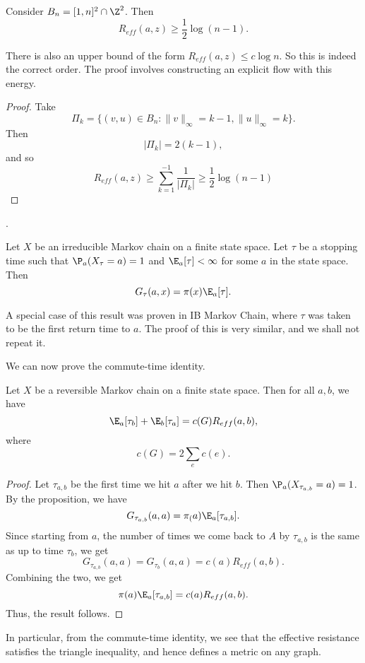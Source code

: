 \documentclass[a4paper]{article}
\begin{document}
\begin{cor}
  Consider $B_n = [1, n]^2 \cap \Z^2$. Then
  \[
    R_{eff}(a, z) \geq \frac{1}{2} \log (n - 1).
  \]
\end{cor}
There is also an upper bound of the form $R_{eff}(a, z) \leq c \log n$. So this is indeed the correct order. The proof involves constructing an explicit flow with this energy.

\begin{proof}
  Take
  \[
    \Pi_k = \{(v, u) \in B_n: \|v\|_\infty = k - 1, \|u\|_\infty = k\}.
  \]
  Then
  \[
    |\Pi_k| = 2(k - 1),
  \]
  and so
  \[
    R_{eff}(a, z) \geq \sum_{k = 1}^{ - 1} \frac{1}{|\Pi_k|} \geq \frac{1}{2} \log (n - 1)
  \]
\end{proof}.

\begin{prop}
  Let $X$ be an irreducible Markov chain on a finite state space. Let $\tau$ be a stopping time such that $\P_a(X_\tau = a) = 1$ and $\E_a[\tau] < \infty$ for some $a$ in the state space. Then
  \[
    G_\tau(a, x) = \pi(x) \E_a[\tau]. %
  \]
\end{prop}
A special case of this result was proven in IB Markov Chain, where $\tau$ was taken to be the first return time to $a$. The proof of this is very similar, and we shall not repeat it.

We can now prove the commute-time identity.
\begin{thm}
  Let $X$ be a reversible Markov chain on a finite state space. Then for all $a, b$, we have
  \[
    \E_a [\tau_b] + \E_b[ \tau_a] = c(G) R_{eff}(a, b),
  \]
  where
  \[
    c(G) = 2 \sum_e c(e).
  \]
\end{thm}

\begin{proof}
  Let $\tau_{a,b}$ be the first time we hit $a$ after we hit $b$. Then $\P_a(X_{\tau_{a, b}} = a) = 1$. By the proposition, we have
  \[
    G_{\tau_{a, b}}(a, a) = \pi_(a) \E_a[\tau_{a,b}].
  \]
  Since starting from $a$, the number of times we come back to $A$ by $\tau_{a, b}$ is the same as up to time $\tau_b$, we get
  \[
    G_{\tau_{a,b}}(a, a) = G_{\tau_b}(a, a) = c(a) R_{eff}(a, b).
  \]
  Combining the two, we get
  \[
    \pi(a) \E_a[\tau_{a, b}] = c(a) R_{eff}(a, b).
  \]
  Thus, the result follows.
\end{proof}
In particular, from the commute-time identity, we see that the effective resistance satisfies the triangle inequality, and hence defines a metric on any graph.
\end{document}
